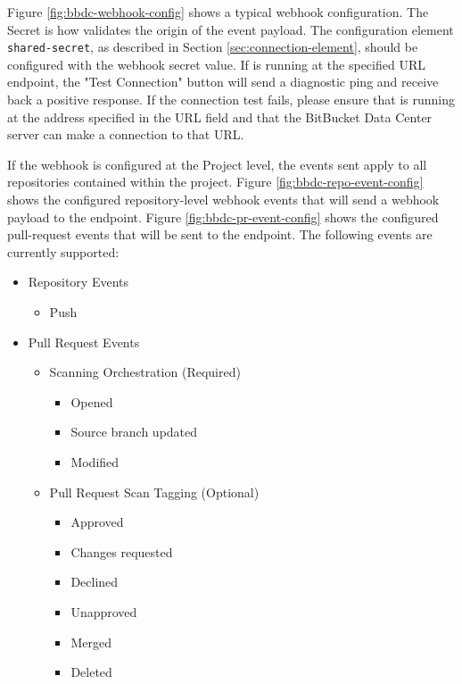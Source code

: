 Figure \ref{fig:bbdc-webhook-config} shows a typical webhook configuration.  The Secret is how \cxoneflow
validates the origin of the event payload.  The configuration element \texttt{shared-secret}, as described
in Section \ref{sec:connection-element}, should be configured with the webhook secret value.  If \cxoneflow
is running at the specified URL endpoint, the "Test Connection" button will send a diagnostic ping
and receive back a positive response.  If the connection test fails, please ensure that \cxoneflow is running
at the address specified in the URL field and that the BitBucket Data Center server can make a connection
to that URL.

If the webhook is configured at the Project level, the events sent apply to all repositories contained
within the project.  Figure \ref{fig:bbdc-repo-event-config} shows the configured repository-level webhook 
events that will send a webhook payload to the \cxoneflow endpoint. 
Figure \ref{fig:bbdc-pr-event-config} shows the configured pull-request events that will be sent to 
the \cxoneflow endpoint.  The following events are currently supported:


\pagebreak
\begin{itemize}
    \item Repository Events
        \begin{itemize}
            \item Push
        \end{itemize}
    \item Pull Request Events
        \begin{itemize}
            \item Scanning Orchestration (Required)
                \begin{itemize}
                    \item Opened
                    \item Source branch updated
                    \item Modified
                \end{itemize}
        \end{itemize}
        \begin{itemize}
            \item Pull Request Scan Tagging (Optional)
                \begin{itemize}
                    \item Approved
                    \item Changes requested
                    \item Declined
                    \item Unapproved
                    \item Merged
                    \item Deleted
                \end{itemize}
        \end{itemize}

\end{itemize}



